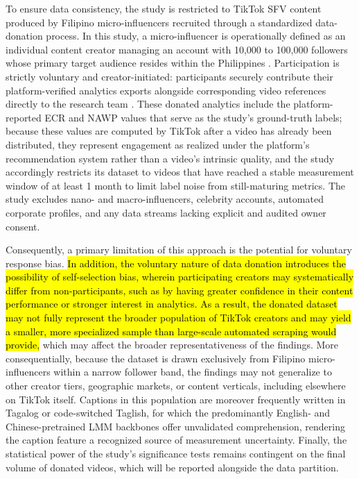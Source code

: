 To ensure data consistency, the study is restricted to TikTok SFV content produced by Filipino micro-influencers recruited through a standardized data-donation process. In this study, a micro-influencer is operationally defined as an individual content creator managing an account with 10,000 to 100,000 followers whose primary target audience resides within the Philippines \cite{anymindgroup_2026_state}. Participation is strictly voluntary and creator-initiated: participants securely contribute their platform-verified analytics exports alongside corresponding video references directly to the research team \cite{zannettou2024analyzing, garimella_2025_data, li2024delving}. These donated analytics include the platform-reported ECR and NAWP values that serve as the study's ground-truth labels; because these values are computed by TikTok after a video has already been distributed, they represent engagement as realized under the platform's recommendation system rather than a video's intrinsic quality, and the study accordingly restricts its dataset to videos that have reached a stable measurement window of at least 1 month to limit label noise from still-maturing metrics. The study excludes nano- and macro-influencers, celebrity accounts, automated corporate profiles, and any data streams lacking explicit and audited owner consent. 

Consequently, a primary limitation of this approach is the potential for voluntary response bias. \hl{In addition, the voluntary nature of data donation introduces the possibility of self-selection bias, wherein participating creators may systematically differ from non-participants, such as by having greater confidence in their content performance or stronger interest in analytics. As a result, the donated dataset may not fully represent the broader population of TikTok creators and may yield a smaller, more specialized sample than large-scale automated scraping would provide,} which may affect the broader representativeness of the findings. More consequentially, because the dataset is drawn exclusively from Filipino micro-influencers within a narrow follower band, the findings may not generalize to other creator tiers, geographic markets, or content verticals, including elsewhere on TikTok itself. Captions in this population are moreover frequently written in Tagalog or code-switched Taglish, for which the predominantly English- and Chinese-pretrained LMM backbones offer unvalidated comprehension, rendering the caption feature a recognized source of measurement uncertainty. Finally, the statistical power of the study's significance tests remains contingent on the final volume of donated videos, which will be reported alongside the data partition.

